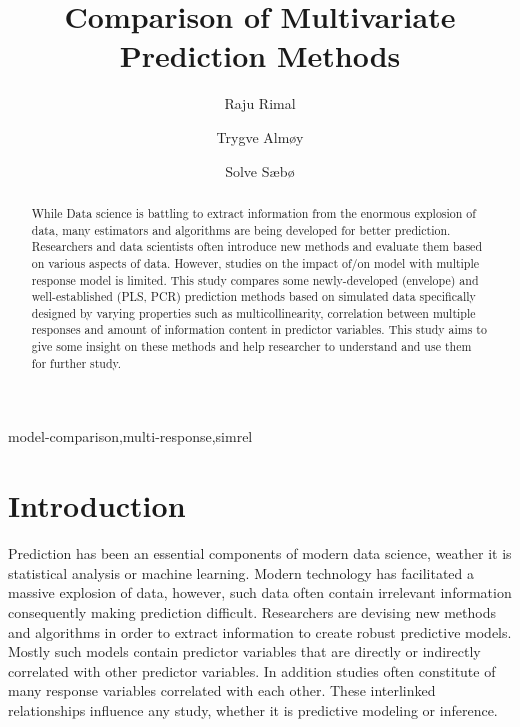 \documentclass[12pt,3p,authoryear]{elsarticle}
\begin{document}
\begin{frontmatter}

  \title{Comparison of Multivariate Prediction Methods}
  
    \author[KBM]{Raju Rimal}
    \author[KBM]{Trygve Almøy}
  
    \author[NMBU]{Solve Sæbø}
  
      \address[KBM]{Faculty of Chemistry and Bioinformatics, Norwegian University of Life
Sciences, Ås, Norway}
    \address[NMBU]{Prorector, Norwegian University of Life Sciences, Ås, Norway}
  
  \begin{abstract}
  While Data science is battling to extract information from the enormous
  explosion of data, many estimators and algorithms are being developed
  for better prediction. Researchers and data scientists often introduce
  new methods and evaluate them based on various aspects of data. However,
  studies on the impact of/on model with multiple response model is
  limited. This study compares some newly-developed (envelope) and
  well-established (PLS, PCR) prediction methods based on simulated data
  specifically designed by varying properties such as multicollinearity,
  correlation between multiple responses and amount of information content
  in predictor variables. This study aims to give some insight on these
  methods and help researcher to understand and use them for further
  study.
  \end{abstract}
   \begin{keyword} model-comparison,multi-response,simrel\end{keyword}

\end{frontmatter}

\section{Introduction}\label{introduction}

Prediction has been an essential components of modern data science,
weather it is statistical analysis or machine learning. Modern
technology has facilitated a massive explosion of data, however, such
data often contain irrelevant information consequently making prediction
difficult. Researchers are devising new methods and algorithms in order
to extract information to create robust predictive models. Mostly such
models contain predictor variables that are directly or indirectly
correlated with other predictor variables. In addition studies often
constitute of many response variables correlated with each other. These
interlinked relationships influence any study, whether it is predictive
modeling or inference.
\end{document}
